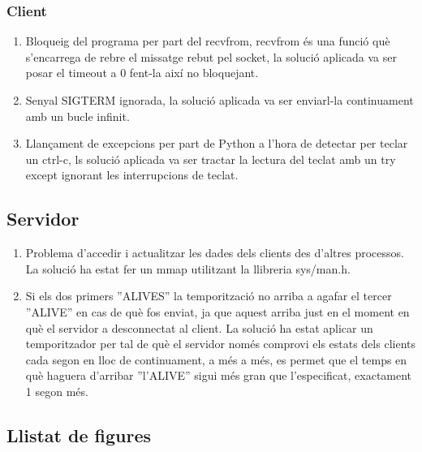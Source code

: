 \documentclass[11pt]{article}
\begin{document}
		\subsubsection*{Client}
\begin{enumerate}
\item Bloqueig del programa per part del recvfrom, recvfrom és una funció què s'encarrega de rebre el missatge rebut pel socket, la solució aplicada va ser posar el timeout a 0 fent-la així no bloquejant.
\item Senyal SIGTERM ignorada, la solució aplicada va ser enviarl-la continuament amb un bucle infinit.
\item Llançament de excepcions per part de Python a l'hora de detectar per teclar un ctrl-c, ls solució aplicada va ser tractar la lectura del teclat amb un try except ignorant les interrupcions de teclat.
\end{enumerate}
		\subsection*{Servidor}
\begin{enumerate}
\item Problema d'accedir i actualitzar les dades dels clients des d'altres processos. La solució ha estat fer un mmap utilitzant la llibreria sys/man.h.
\item Si els dos primers ''ALIVES'' la temporització no arriba a agafar el tercer ''ALIVE'' en cas de què fos enviat, ja que aquest arriba just en el moment en què el servidor a desconnectat al client. La solució ha estat aplicar un temporitzador per tal de què el servidor només comprovi els estats dels clients cada segon en lloc de continuament, a més a més, es permet que el temps en què haguera d'arribar ''l'ALIVE'' sigui més gran que l'especificat, exactament 1 segon més.
\end{enumerate}
	\subsection{Llistat de figures}
\listoffigures{}
\newpage
\end{document}
